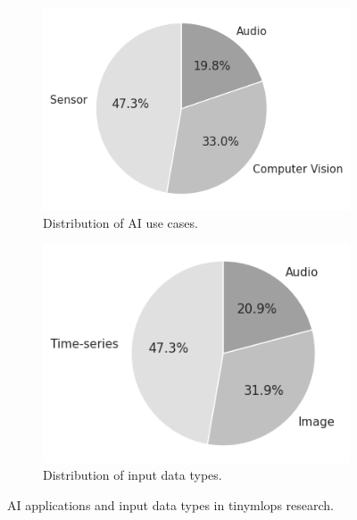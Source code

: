 \begin{figure}[htbp]
    \centering
    \begin{subfigure}{0.49\textwidth}
        \centering
        \includegraphics[width=\textwidth]{figs/research_results/sms_used_ai_type.png}
        \caption[AI use case distribution]{Distribution of AI use cases.}
        \label{fig:ai-use-cases}
    \end{subfigure}
    \hfill
    \begin{subfigure}{0.49\textwidth}
        \centering
        \includegraphics[width=\textwidth]{figs/research_results/sms_used_input_data_type.png}
        \caption[Input data type distribution]{Distribution of input data types.}
        \label{fig:input-data}
    \end{subfigure}
    \caption{AI applications and input data types in \gls{tinymlops} research.}
    \label{fig:ai-use-case-vs-input}
\end{figure}

